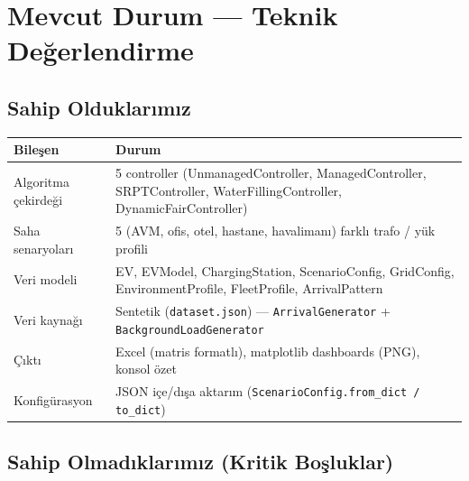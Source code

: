 \documentclass[11pt,a4paper]{article}
\begin{document}
\section{Mevcut Durum — Teknik Değerlendirme}

\subsection{Sahip Olduklarımız}

\begin{tabularx}{\textwidth}{l X}
\toprule
\textbf{Bileşen} & \textbf{Durum} \\
\midrule
Algoritma çekirdeği & 5 controller (UnmanagedController, ManagedController, SRPTController, WaterFillingController, DynamicFairController) \\
Saha senaryoları & 5 (AVM, ofis, otel, hastane, havalimanı) farklı trafo / yük profili \\
Veri modeli & EV, EVModel, ChargingStation, ScenarioConfig, GridConfig, EnvironmentProfile, FleetProfile, ArrivalPattern \\
Veri kaynağı & Sentetik (\texttt{dataset.json}) — \texttt{ArrivalGenerator} + \texttt{BackgroundLoadGenerator} \\
Çıktı & Excel (matris formatlı), matplotlib dashboards (PNG), konsol özet \\
Konfigürasyon & JSON içe/dışa aktarım (\texttt{ScenarioConfig.from\_dict / to\_dict}) \\
\bottomrule
\end{tabularx}

\subsection{Sahip Olmadıklarımız (Kritik Boşluklar)}
\end{document}
